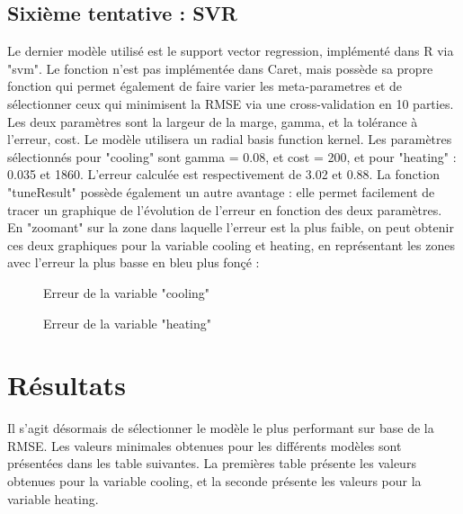 \documentclass[11pt,a4paper]{article}
\begin{document}
\subsection{Sixième tentative : SVR}

Le dernier modèle utilisé est le support vector regression, implémenté dans R via "svm". Le fonction n'est pas implémentée dans Caret, mais possède sa propre fonction qui permet également de faire varier les meta-parametres et de sélectionner ceux qui minimisent la RMSE via une cross-validation en 10 parties. Les deux paramètres sont la largeur de la marge, gamma, et la tolérance à l'erreur, cost. Le modèle utilisera un radial basis function kernel. Les paramètres sélectionnés pour "cooling" sont gamma = 0.08, et cost = 200, et pour "heating" : 0.035 et 1860. L'erreur calculée est respectivement de 3.02 et 0.88. La fonction "tuneResult" possède également un autre avantage : elle permet facilement de tracer un graphique de l'évolution de l'erreur en fonction des deux paramètres. En "zoomant" sur la zone dans laquelle l'erreur est la plus faible, on peut obtenir ces deux graphiques pour la variable cooling et heating, en représentant les zones avec l'erreur la plus basse en bleu plus fonçé :


\begin{figure}[!htb]\centering
   \begin{minipage}{0.4\textwidth}
     \caption{Erreur de la variable "cooling"}\label{Fig:Data1}
   \end{minipage}
   \begin {minipage}{0.4\textwidth}
     \caption{Erreur de la variable "heating"}\label{Fig:Data2}
   \end{minipage}
\end{figure}


\section{Résultats}

Il s'agit désormais de sélectionner le modèle le plus performant sur base de la RMSE. Les valeurs minimales obtenues pour les différents modèles sont présentées dans les table suivantes. La premières table présente les valeurs obtenues pour la variable cooling, et la seconde présente les valeurs pour la variable heating. \bigskip
\end{document}
